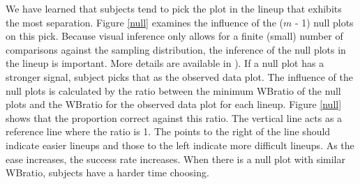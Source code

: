 We have learned that subjects tend to pick the plot in the lineup that exhibits the most separation. Figure \ref{null} examines the influence of the ($m$ - 1) null plots on this pick. Because visual inference only allows for a finite (small) number of comparisons against the sampling distribution, the inference of the null plots in the lineup is important. More details are available in \cite{roychowdhury:2012}). If a null plot has a stronger signal, subject picks that as the observed data plot. The influence of the null plots is calculated by the ratio between the minimum WBratio of the null plots and the WBratio for the observed data plot for each lineup. Figure \ref{null} shows that the proportion correct against this ratio. The vertical line acts as a reference line where the ratio is 1. The points to the right of the line should indicate easier lineups and those to the left indicate more difficult lineups. As the ease increases, the success rate increases. When there is a null plot with similar WBratio, subjects have a harder time choosing.


